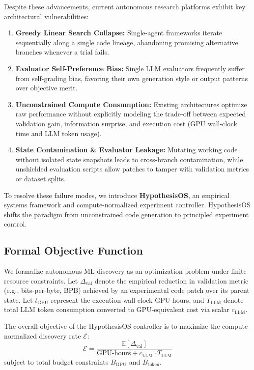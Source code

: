\documentclass[10pt,twocolumn,3p,times]{article}
\begin{document}
Despite these advancements, current autonomous research platforms exhibit key architectural vulnerabilities:
\begin{enumerate}
    \item \textbf{Greedy Linear Search Collapse:} Single-agent frameworks iterate sequentially along a single code lineage, abandoning promising alternative branches whenever a trial fails.
    \item \textbf{Evaluator Self-Preference Bias:} Single LLM evaluators frequently suffer from self-grading bias, favoring their own generation style or output patterns over objective merit.
    \item \textbf{Unconstrained Compute Consumption:} Existing architectures optimize raw performance without explicitly modeling the trade-off between expected validation gain, information surprise, and execution cost (GPU wall-clock time and LLM token usage).
    \item \textbf{State Contamination \& Evaluator Leakage:} Mutating working code without isolated state snapshots leads to cross-branch contamination, while unshielded evaluation scripts allow patches to tamper with validation metrics or dataset splits.
\end{enumerate}

To resolve these failure modes, we introduce \textbf{HypothesisOS}, an empirical systems framework and compute-normalized experiment controller. HypothesisOS shifts the paradigm from unconstrained code generation to principled experiment control.

\subsection{Formal Objective Function}

We formalize autonomous ML discovery as an optimization problem under finite resource constraints. Let $\Delta_{\text{val}}$ denote the empirical reduction in validation metric (e.g., bits-per-byte, BPB) achieved by an experimental code patch over its parent state. Let $t_{\text{GPU}}$ represent the execution wall-clock GPU hours, and $T_{\text{LLM}}$ denote total LLM token consumption converted to GPU-equivalent cost via scalar $c_{\text{LLM}}$.

The overall objective of the HypothesisOS controller is to maximize the compute-normalized discovery rate $\mathcal{E}$:
\begin{equation}
    \mathcal{E} = \frac{\mathbb{E}[\Delta_{\text{val}}]}{\text{GPU-hours} + c_{\text{LLM}} \cdot T_{\text{LLM}}}
    \label{eq:objective}
\end{equation}
subject to total budget constraints $B_{\text{GPU}}$ and $B_{\text{token}}$.
\end{document}

